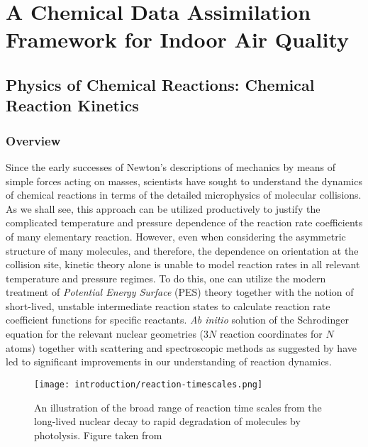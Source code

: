 \chapter{A Chemical Data Assimilation Framework for Indoor Air Quality}




\section{Physics of Chemical Reactions: Chemical Reaction Kinetics}

\subsection{Overview}

Since the early successes of Newton's descriptions of mechanics by means of simple forces acting on masses, scientists have sought to understand the dynamics of chemical reactions in terms of the detailed microphysics of molecular collisions. As we shall see, this approach can be utilized productively to justify the complicated temperature and pressure dependence of the reaction rate coefficients of many elementary reaction. However, even when considering the asymmetric structure of many molecules, and therefore, the dependence on orientation at the collision site, kinetic theory alone is unable to model reaction rates in all relevant temperature and pressure regimes. To do this, one can utilize the modern treatment of \textit{Potential Energy Surface} (PES) theory together with the notion of short-lived, unstable intermediate reaction states to calculate reaction rate coefficient functions for specific reactants. \textit{Ab initio} solution of the Schrodinger equation for the relevant nuclear geometries ($3N$ reaction coordinates for $N$ atoms) together with scattering and spectroscopic methods as suggested by \cite{transition-state-spectroscopy-bimol} have led to significant improvements in our understanding of reaction dynamics.



\begin{figure}[h]
  \centering
  \texttt{[image: introduction/reaction-timescales.png]}
  \caption{An illustration of the broad range of reaction time scales from the long-lived nuclear decay to rapid degradation of molecules by photolysis. Figure taken from \cite{arnaut2006chemical}}
  \label{fig:reaction-timescales}
\end{figure}


